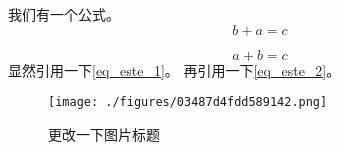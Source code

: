 
我们有一个公式。
\begin{equation}\label{eq_este_2}
b + a = c
\end{equation}

\begin{equation}\label{eq_este_1}
a + b = c
\end{equation}
显然引用一下\autoref{eq_este_1}。 再引用一下\autoref{eq_este_2}。

\begin{figure}[ht]
\centering
\texttt{[image: ./figures/03487d4fdd589142.png]}
\caption{更改一下图片标题} \label{fig_este_1}
\end{figure}

